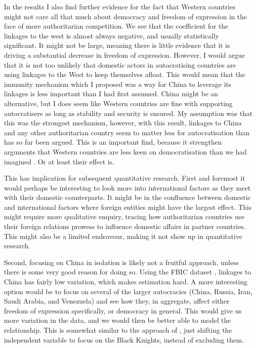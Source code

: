 In the results I also find further evidence for the fact that Western countries might not care all that much about democracy and freedom of expression in the face of more authoritarian competition. We see that the coefficient for the linkages to the west is almost always negative, and usually statistically significant. It might not be large, meaning there is little evidence that it is driving a substantial decrease in freedom of expression. However, I would argue that it is not too unlikely that domestic actors in autocratising countries are using linkages to the West to keep themselves afloat. This would mean that the immunity mechanism which I proposed was a way for China to leverage its linkages is less important than I had first assumed. China might be an alternative, but I does seem like Western countries are fine with supporting autocratisers as long as stability and security is ensured. My assumption was that this was the strongest mechanism, however, with this result, linkages to China and any other authoritarian country seem to matter less for autocratisation than has so far been argued. This is an important find, because it strengthen arguments that Western countries are less keen on democratisation than we had imagined \citep{borzel_noble_2015, delcour_spoiler_2015, freyburg_local_2015, risse_democracy_2015}. Or at least their effect is. 

This has implication for subsequent quantitative research. First and foremost it would perhaps be interesting to look more into international factors as they meet with their domestic counterparts. It might be in the confluence between domestic and international factors where foreign entities might have the largest effect. This might require more qualitative enquiry, tracing how authoritarian countries use their foreign relations prowess to influence domestic affairs in partner countries. This might also be a limited endeavour, making it not show up in quantitative research. 

Second, focusing on China in isolation is likely not a fruitful approach, unless there is some very good reason for doing so. Using the FBIC dataset \citep{moyer_china-us_2021}, linkages to China has fairly low variation, which makes estimation hard. A more interesting option would be to focus on several of the larger autocracies (China, Russia, Iran, Saudi Arabia, and Venezuela) and see how they, in aggregate, affect either freedom of expression specifically, or democracy in general. This would give us more variation in the data, and we would then be better able to model the relationship. This is somewhat similar to the approach of \citet{tansey_ties_2017}, just shifting the independent variable to focus on the Black Knights, instead of excluding them. 

